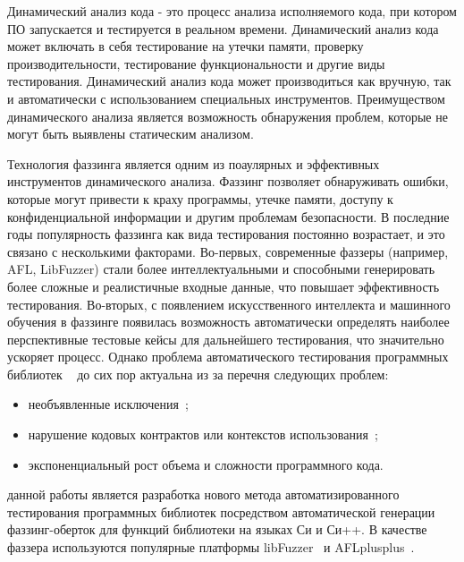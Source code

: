 Динамический анализ кода - это процесс анализа исполняемого кода, при котором ПО запускается и тестируется в реальном времени. Динамический анализ кода может включать в себя тестирование на утечки памяти, проверку производительности, тестирование функциональности и другие виды тестирования. Динамический анализ кода может производиться как вручную, так и автоматически с использованием специальных инструментов. Преимуществом динамического анализа является возможность обнаружения проблем, которые не могут быть выявлены статическим анализом. 

Технология фаззинга является одним из поаулярных и эффективных инструментов  динамического анализа. Фаззинг позволяет обнаруживать ошибки, которые могут привести к краху программы, утечке памяти, доступу к конфиденциальной информации и другим проблемам безопасности. В последние годы популярность фаззинга как вида тестирования постоянно возрастает, и это связано с несколькими факторами. Во-первых, современные фаззеры (например, AFL, LibFuzzer) стали более интеллектуальными и способными генерировать более сложные и реалистичные входные данные, что повышает эффективность тестирования. Во-вторых, с появлением искусственного интеллекта и машинного обучения в фаззинге появилась возможность автоматически определять наиболее перспективные тестовые кейсы для дальнейшего тестирования, что значительно ускоряет процесс. Однако проблема автоматического тестирования программных библиотек ~\autocite{Shamshiri2018HowDA} до сих пор актуальна из за перечня следующих проблем:
\begin{itemize}
    \item необъявленные исключения~\autocite{Csallner2004JCrasherAA};
    \item нарушение кодовых контрактов или контекстов использования~\autocite{4222570};
    \item экспоненциальный рост объема и сложности программного кода.
\end{itemize}

{\aim} данной работы является разработка нового метода автоматизированного тестирования программных библиотек посредством автоматической генерации фаззинг-оберток для функций библиотеки на языках Си и Си++. В качестве  фаззера используются популярные платформы libFuzzer~\autocite{libFuzzer} и AFLplusplus~\autocite{AFLplusplus}.

